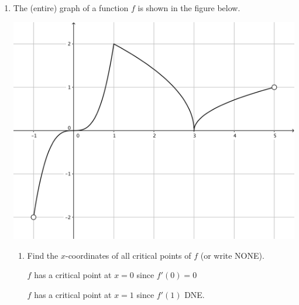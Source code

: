\documentclass[nooutcomes,handout]{ximera}
\begin{document}
\begin{problem}
\begin{enumerate}
\begin{freeResponse}
\begin{center}
\begin{image}
\begin{tikzpicture}[xscale=2,yscale=2]
\end{tikzpicture}
\end{image}
\end{center}


		\end{freeResponse}
	
	\end{enumerate}
		
\end{problem}




\begin{problem}

  \begin{enumerate}
    \item
      The (entire) graph of a function $f$ is shown in the figure below.
      \begin{image}
        \includegraphics[scale = 0.3]{figure3.png}
      \end{image}
      \begin{enumerate}
        \item
          Find the $x$-coordinates of all critical points of $f$ (or write NONE).
          \begin{freeResponse}
            $f$ has a critical point at $x = 0$ since $f'(0) = 0$

            $f$ has a critical point at $x = 1$ since $f'(1)$ DNE.


\end{freeResponse}
\end{enumerate}
\end{enumerate}
\end{problem}
\end{document}
